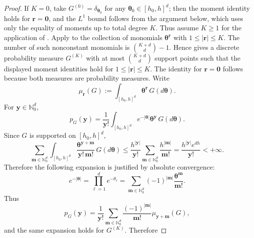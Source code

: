 \documentclass[twoside,12pt]{article}
\begin{document}
\begin{proof}
If $K=0$, take $G^{(0)}=\delta_{\boldsymbol\theta_0}$ for any $\boldsymbol\theta_0\in[h_0,h]^d$; then the moment identity holds for $\boldsymbol r=\boldsymbol 0$, and the $L^1$ bound follows from the argument below, which uses only the equality of moments up to total degree $K$. Thus assume $K\ge 1$ for the application of \citet[Lemma A.1]{Gho(01)}. Apply \citet[Lemma A.1]{Gho(01)} to the collection of monomials $\boldsymbol\theta^{\boldsymbol r}$ with $1\le |\boldsymbol r|\le K$. The number of such nonconstant monomials is $\binom{K+d}{d}-1$. Hence \citet[Lemma A.1]{Gho(01)} gives a discrete probability measure $G^{(K)}$ with at most $\binom{K+d}{d}$ support points such that the displayed moment identities hold for $1\le |\boldsymbol r|\le K$. The identity for $\boldsymbol r=\boldsymbol 0$ follows because both measures are probability measures. Write
\begin{displaymath}
\mu_{\boldsymbol r}(G):=\int_{[h_{0},h]^d}\boldsymbol\theta^{\boldsymbol r}\,G(d\boldsymbol\theta).
\end{displaymath}
For $\boldsymbol y\in\mathbb N_0^d$,
\begin{displaymath}
p_G(\boldsymbol y)=\frac{1}{\boldsymbol y!}\int_{[h_{0},h]^d}e^{-|\boldsymbol\theta|}\boldsymbol\theta^{\boldsymbol y}\,G(d\boldsymbol\theta).
\end{displaymath}
Since $G$ is supported on $[h_{0},h]^d$,
\begin{displaymath}
\sum_{\boldsymbol m\in\mathbb N_0^d}\int_{[h_{0},h]^d}\frac{\boldsymbol\theta^{\boldsymbol y+\boldsymbol m}}{\boldsymbol y!\,\boldsymbol m!}\,G(d\boldsymbol\theta)\le
\frac{h^{|\boldsymbol y|}}{\boldsymbol y!}\sum_{\boldsymbol m\in\mathbb N_0^d}\frac{h^{|\boldsymbol m|}}{\boldsymbol m!}=\frac{h^{|\boldsymbol y|}e^{dh}}{\boldsymbol y!}<
+\infty.
\end{displaymath}
Therefore the following expansion is justified by absolute convergence:
\begin{displaymath}
e^{-|\boldsymbol\theta|}=\prod_{\ell=1}^d e^{-\theta_\ell}=\sum_{\boldsymbol m\in\mathbb N_0^d}(-1)^{|\boldsymbol m|}\frac{\boldsymbol\theta^{\boldsymbol m}}{\boldsymbol m!}.
\end{displaymath}
Thus
\begin{displaymath}
p_G(\boldsymbol y)=\frac{1}{\boldsymbol y!}\sum_{\boldsymbol m\in\mathbb N_0^d}\frac{(-1)^{|\boldsymbol m|}}{\boldsymbol m!}\mu_{\boldsymbol y+\boldsymbol m}(G),
\end{displaymath}
and the same expansion holds for $G^{(K)}$. Therefore

\end{proof}
\end{document}
